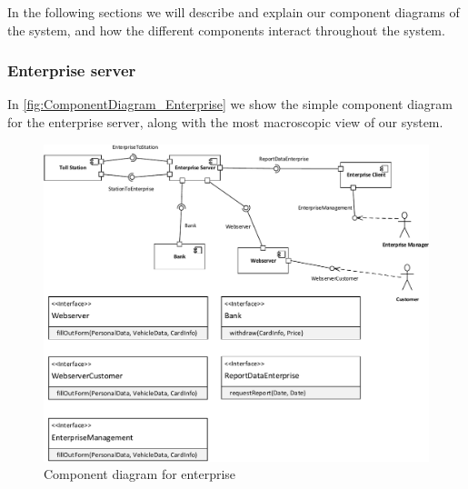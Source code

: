 
In the following sections we will describe and explain our component diagrams of the system, and how the different components interact throughout the system.

\subsubsection*{Enterprise server}
In \autoref{fig:ComponentDiagram_Enterprise} we show the simple component diagram for the enterprise server, along with the most macroscopic view of our system. 
\begin{figure}[H]
\centering
\includegraphics[width=1\textwidth]{img/component_diagrams/ComponentDiagram_Enterprise}
\caption{Component diagram for enterprise}
\label{fig:ComponentDiagram_Enterprise}
\end{figure}


